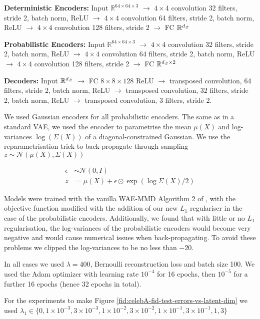 \textbf{Deterministic Encoders:} Input $\mathbb{R}^{64 \times 64 \times 3}$ $\rightarrow$ $4\times 4$ convolution 32 filters, stride 2, batch norm, ReLU $\rightarrow$ $4\times 4$ convolution 64 filters, stride 2, batch norm, ReLU $\rightarrow$ $4\times 4$ convolution 128 filters, stride 2 $\rightarrow$ FC $\mathbb{R}^{d_{\mathcal{Z}}}$

\textbf{Probabilistic Encoders:} Input $\mathbb{R}^{64 \times 64 \times 3}$ $\rightarrow$ $4\times 4$ convolution 32 filters, stride 2, batch norm, ReLU $\rightarrow$ $4\times 4$ convolution 64 filters, stride 2, batch norm, ReLU $\rightarrow$ $4\times 4$ convolution 128 filters, stride 2 $\rightarrow$ FC $\mathbb{R}^{d_{\mathcal{Z}} \times 2}$

\textbf{Decoders:} Input $\mathbb{R}^{d_{\mathcal{Z}}}$ $\rightarrow$ FC $8 \times 8 \times 128$ ReLU $\rightarrow$ transposed convolution, 64 filters, stride 2, batch norm, ReLU $\rightarrow$ transposed convolution, 32 filters, stride 2, batch norm, ReLU $\rightarrow$ transposed convolution, 3 filters, stride 2.

We used Gaussian encoders for all probabilistic encoders. The same as in a standard VAE, we used the encoder to parametrise the mean $\mu(X)$ and log-variances $\log(\Sigma(X))$ of a diagonal-constrained Gaussian. We use the reparametrisation trick to back-propagate through sampling $z \sim \mathcal{N}\left(\mu(X), \Sigma(X)\right)$

\begin{align*}
	\epsilon &\sim \mathcal{N}\left(0, I\right)\\
	z &= \mu(X) + \epsilon \odot \exp\left( \log\Sigma(X) / 2\right)
\end{align*}

Models were trained with the vanilla WAE-MMD Algorithm 2 of \cite{TBG+17}, with the objective function modified with the addition of our new $L_1$ regulariser in the case of the probabilistic encoders. Additionally, we found that with little or no $L_1$ regularisation, the log-variances of the probabilistic encoders would become very negative and would cause numerical issues when back-propagating. To avoid these problems we clipped the log-variances to be no less than $-20$.

In all cases we used $\lambda = 400$, Bernoulli reconstruction loss and batch size 100. We used the Adam optimizer with learning rate $10^{-4}$ for 16 epochs, then $10^{-5}$ for a further 16 epochs (hence 32 epochs in total).

For the experiments to make Figure \ref{fid:celebA-fid-test-errors-vs-latent-dim} we used $\lambda_1 \in \{0, 1\!\times\!10^{-3},  3\!\times\! 10^{-3}, 1\!\times\! 10^{-2}, 3\!\times\! 10^{-2}, 1\!\times\! 10^{-1}, 3\!\times\! 10^{-1}, 1, 3\}$



